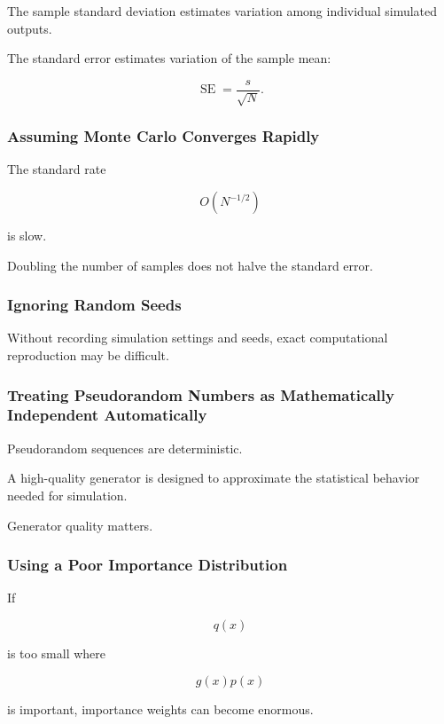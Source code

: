 The sample standard deviation estimates variation among individual
simulated outputs.

The standard error estimates variation of the sample mean:

\[
\boxed{
\operatorname{SE}
=
\frac{s}{\sqrt{N}}.
}
\]

\subsubsection{Assuming Monte Carlo Converges Rapidly}

The standard rate

\[
O(N^{-1/2})
\]

is slow.

Doubling the number of samples does not halve the standard error.

\subsubsection{Ignoring Random Seeds}

Without recording simulation settings and seeds, exact computational
reproduction may be difficult.

\subsubsection{Treating Pseudorandom Numbers as Mathematically Independent Automatically}

Pseudorandom sequences are deterministic.

A high-quality generator is designed to approximate the statistical
behavior needed for simulation.

Generator quality matters.

\subsubsection{Using a Poor Importance Distribution}

If

\[
q(x)
\]

is too small where

\[
g(x)p(x)
\]

is important, importance weights can become enormous.


